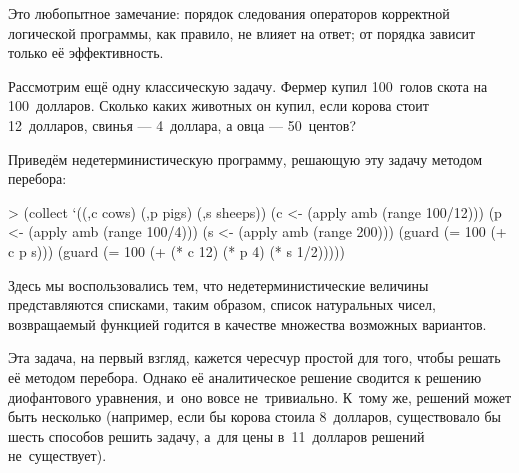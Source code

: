 Это любопытное замечание: порядок следования операторов корректной логической программы, как правило, не влияет на ответ; от порядка зависит только её эффективность.

Рассмотрим ещё одну классическую задачу. Фермер купил 100~голов скота на 100~долларов. Сколько каких животных он купил, если корова стоит 12~долларов, свинья --- 4~доллара, а овца --- 50~центов?

Приведём недетерминистическую программу, решающую эту задачу методом перебора:

\begin{SchemeCode}[emph={c,p,s}]
   > (collect `((,c cows) (,p pigs) (,s sheeps))
      (c <- (apply amb (range 100/12)))
      (p <- (apply amb (range 100/4)))
      (s <- (apply amb (range 200)))
      (guard (= 100 (+ c p s)))
      (guard (= 100 (+ (* c 12) (* p 4) (* s 1/2)))))
\end{SchemeCode}

Здесь мы воспользовались тем, что недетерминистические величины представляются списками, таким образом, список натуральных чисел, возвращаемый функцией  годится в качестве множества возможных вариантов.

Эта задача, на первый взгляд, кажется чересчур простой для того, чтобы решать её методом перебора. Однако её аналитическое решение сводится к решению диофантового уравнения, и~оно вовсе не~тривиально. К~тому же, решений может быть несколько (например, если бы корова стоила 8~долларов, существовало бы шесть способов решить задачу, а~для цены в~11~долларов решений не~существует).

